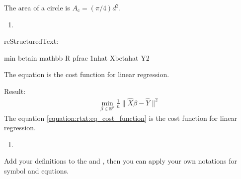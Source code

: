 \documentclass[letterpaper,11pt,english]{sphinxmanual}
\begin{document}
The area of a circle is \(A_\text{c} = (\pi/4) d^2\).
\begin{enumerate}
\def\theenumi{\arabic{enumi}}
\def\labelenumi{\theenumi .}
\makeatletter\def\p@enumii{\p@enumi \theenumi .}\makeatother
\setcounter{enumi}{1}
\item {} 

\end{enumerate}

reStructuredText:

\begin{sphinxVerbatim}[commandchars=\\\{\}]
 
        

       \PYGZbs{}min \PYGZus{}\PYGZob{}\PYGZbs{}beta\PYGZbs{}in \PYGZbs{}mathbb \PYGZob{}R\PYGZcb{} \PYGZca{}\PYGZob{}p\PYGZcb{}\PYGZcb{}\PYGZob{}\PYGZbs{}frac \PYGZob{}1\PYGZcb{}\PYGZob{}n\PYGZcb{}\PYGZcb{}\PYGZbs{}\textbar{}\PYGZob{}\PYGZbs{}hat \PYGZob{}X\PYGZcb{}\PYGZcb{}\PYGZbs{}beta\PYGZhy{}\PYGZob{}\PYGZbs{}hat \PYGZob{}Y\PYGZcb{}\PYGZcb{}\PYGZbs{}\textbar{}\PYGZca{}\PYGZob{}2\PYGZcb{}

The equation  is the cost function for linear regression.
\end{sphinxVerbatim}

Result:
\begin{equation}\label{equation:rtxt:eq_cost_function}
\begin{split}\min _{\beta\in \mathbb {R} ^{p}}{\frac {1}{n}}\|{\hat {X}}\beta-{\hat {Y}}\|^{2}\end{split}
\end{equation}
The equation \eqref{equation:rtxt:eq_cost_function} is the cost function for linear regression.
\begin{enumerate}
\def\theenumi{\arabic{enumi}}
\def\labelenumi{\theenumi .}
\makeatletter\def\p@enumii{\p@enumi \theenumi .}\makeatother
\setcounter{enumi}{2}
\item {} 

\end{enumerate}

Add your definitions to the  and , then you can apply your own notations for symbol and equtions.
\end{document}
